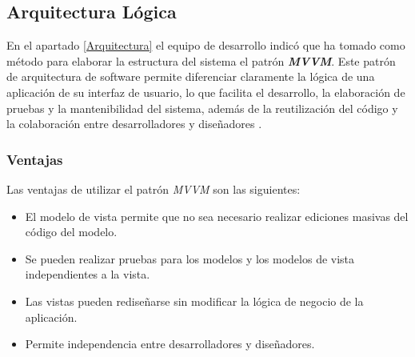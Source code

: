 \subsection{Arquitectura Lógica}
En el apartado \ref{Arquitectura} el equipo de desarrollo indicó que ha tomado como método para elaborar la estructura del 
sistema el patrón \textit{\textbf{MVVM}}. Este patrón de arquitectura de software permite diferenciar claramente 
la lógica de una aplicación de su interfaz de usuario, lo que facilita el desarrollo, la elaboración de pruebas y la 
mantenibilidad del sistema, además de la reutilización del código y la colaboración entre desarrolladores y diseñadores
\autocite{MicrosoftMVVM}. \medskip

\subsubsection{Ventajas}
Las ventajas de utilizar el patrón \textit{MVVM} son las siguientes:
\begin{itemize}
    \item El modelo de vista permite que no sea necesario realizar ediciones masivas del código del modelo.
    \item Se pueden realizar pruebas para los modelos y los modelos de vista independientes a la vista.
    \item Las vistas pueden rediseñarse sin modificar la lógica de negocio de la aplicación.
    \item Permite independencia entre desarrolladores y diseñadores.
\end{itemize}

